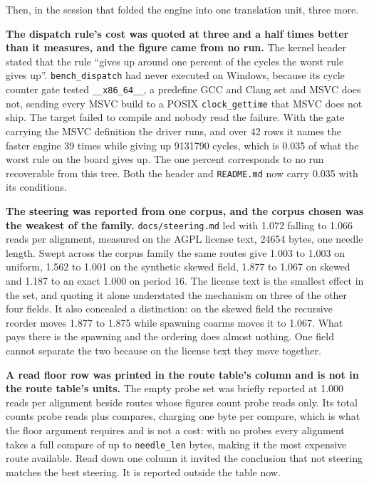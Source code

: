 Then, in the session that folded the engine into one translation unit, three more.

\textbf{The dispatch rule's cost was quoted at three and a half times better than it measures, and the figure came from no run.} The kernel header stated that the rule ``gives up around one percent of the cycles the worst rule gives up''. \texttt{bench\_dispatch} had never executed on Windows, because its cycle counter gate tested \texttt{\_\_x86\_64\_\_}, a predefine GCC and Clang set and MSVC does not, sending every MSVC build to a POSIX \texttt{clock\_gettime} that MSVC does not ship. The target failed to compile and nobody read the failure. With the gate carrying the MSVC definition the driver runs, and over 42 rows it names the faster engine 39 times while giving up 9131790 cycles, which is 0.035 of what the worst rule on the board gives up. The one percent corresponds to no run recoverable from this tree. Both the header and \texttt{README.md} now carry 0.035 with its conditions.

\textbf{The steering was reported from one corpus, and the corpus chosen was the weakest of the family.} \texttt{docs/steering.md} led with 1.072 falling to 1.066 reads per alignment, measured on the AGPL license text, 24654 bytes, one needle length. Swept across the corpus family the same routes give 1.003 to 1.003 on uniform, 1.562 to 1.001 on the synthetic skewed field, 1.877 to 1.067 on skewed and 1.187 to an exact 1.000 on period 16. The license text is the smallest effect in the set, and quoting it alone understated the mechanism on three of the other four fields. It also concealed a distinction: on the skewed field the recursive reorder moves 1.877 to 1.875 while spawning coarms moves it to 1.067. What pays there is the spawning and the ordering does almost nothing. One field cannot separate the two because on the license text they move together.

\textbf{A read floor row was printed in the route table's column and is not in the route table's units.} The empty probe set was briefly reported at 1.000 reads per alignment beside routes whose figures count probe reads only. Its total counts probe reads plus compares, charging one byte per compare, which is what the floor argument requires and is not a cost: with no probes every alignment takes a full compare of up to \texttt{needle\_len} bytes, making it the most expensive route available. Read down one column it invited the conclusion that not steering matches the best steering. It is reported outside the table now.

